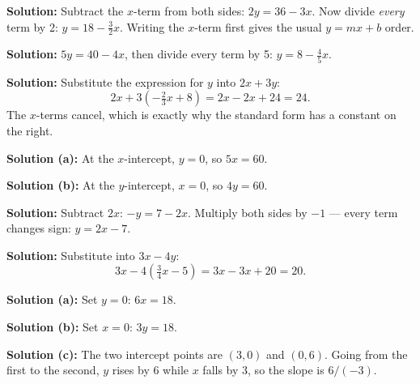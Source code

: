 \documentclass[12pt]{article}
\begin{document}




\textbf{Solution:} Subtract the $x$-term from both sides: $2y = 36 - 3x$. Now
divide \emph{every} term by 2: $y = 18 - \frac{3}{2}x$. Writing the $x$-term
first gives the usual $y = mx + b$ order. 


\textbf{Solution:} $5y = 40 - 4x$, then divide every term by 5:
$y = 8 - \frac{4}{5}x$. 


\textbf{Solution:} Substitute the expression for $y$ into $2x + 3y$:
\[
  2x + 3\left(-\tfrac{2}{3}x + 8\right) = 2x - 2x + 24 = 24 .
\]
The $x$-terms cancel, which is exactly why the standard form has a constant on
the right. 


\textbf{Solution (a):} At the $x$-intercept, $y = 0$, so $5x = 60$.

\textbf{Solution (b):} At the $y$-intercept, $x = 0$, so $4y = 60$.


\textbf{Solution:} Subtract $2x$: $-y = 7 - 2x$. Multiply both sides by $-1$
--- every term changes sign: $y = 2x - 7$. 


\textbf{Solution:} Substitute into $3x - 4y$:
\[
  3x - 4\left(\tfrac{3}{4}x - 5\right) = 3x - 3x + 20 = 20 .
\]


\textbf{Solution (a):} Set $y = 0$: $6x = 18$. 

\textbf{Solution (b):} Set $x = 0$: $3y = 18$. 

\textbf{Solution (c):} The two intercept points are $(3, 0)$ and $(0, 6)$.
Going from the first to the second, $y$ rises by 6 while $x$ falls by 3, so
the slope is $6/(-3)$. 
\end{document}
